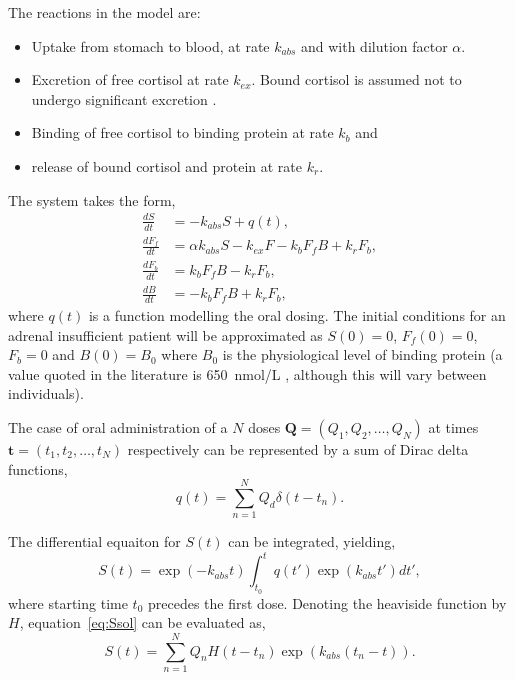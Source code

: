 \documentclass[12pt,a4paper]{article}
\newcommand{\dd}[2]{\frac{d #1}{d #2}}
\begin{document}
The reactions in the model are:
\begin{itemize}
    \item Uptake from stomach to blood, at rate \(k_{abs}\) and with dilution factor \(\alpha\).
    \item Excretion of free cortisol at rate \(k_{ex}\). Bound cortisol is assumed not to undergo significant excretion \cite{sarkar2013}.
    \item Binding of free cortisol to binding protein at rate \(k_{b}\) and 
    \item release of bound cortisol and protein at rate \(k_{r}\).
\end{itemize}

The system takes the form,
\begin{align}
    \dd{S}{t} & = -k_{abs}S + q(t), \\
    \dd{F_f}{t} & =  \alpha k_{abs}S - k_{ex} F - k_b F_f B + k_r F_b, \\
    \dd{F_b}{t} & = k_b F_f B - k_r F_b, \label{eq:fb}\\
    \dd{B}{t} & = - k_b F_f B + k_r F_b, \label{eq:b}
\end{align}
where \(q(t)\) is a function modelling the oral dosing. The initial conditions for an adrenal insufficient patient will be approximated as \(S(0)=0\), \(F_f(0)=0\), \(F_b=0\) and \(B(0)=B_0\) where \(B_0\) is the physiological level of binding protein (a value quoted in the literature is 650~nmol/L \cite{wood1994}, although this will vary between individuals).

The case of oral administration of a \(N\) doses \(\bm{Q}=(Q_1,Q_2,\ldots, Q_N)\) at times \(\bm{t}=(t_1, t_2, \ldots, t_N)\) respectively can be represented by a sum of Dirac delta functions,
\begin{equation}
    q(t) = \sum_{n=1}^N Q_d\delta(t-t_n).
\end{equation}

The differential equaiton for \(S(t)\) can be integrated, yielding,
\begin{equation}
    S(t) = \exp(-k_{abs}t) \int_{t_0}^t q(t') \exp(k_{abs}t') dt',\label{eq:Ssol}
\end{equation}
where starting time \(t_0\) precedes the first dose. Denoting the heaviside function by \(H\), equation~\ref{eq:Ssol} can be evaluated as,
\begin{equation}
    S(t) = \sum_{n=1}^N Q_n H(t-t_n) \exp(k_{abs}(t_n-t)).
\end{equation}
\end{document}

